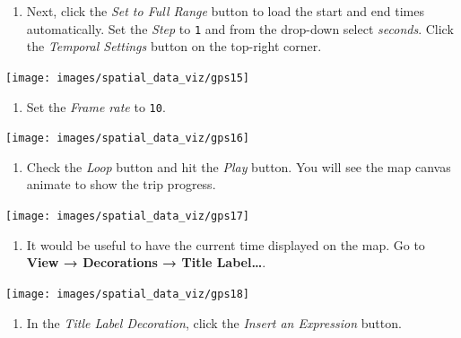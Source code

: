 \documentclass[
  12pt,
  a4paper]{article}
\providecommand{\tightlist}{%
  \setlength{\itemsep}{0pt}\setlength{\parskip}{0pt}}
\begin{document}
\begin{enumerate}
\def\labelenumi{\arabic{enumi}.}
\setcounter{enumi}{14}
\tightlist
\item
  Next, click the \emph{Set to Full Range} button to load the start and
  end times automatically. Set the \emph{Step} to \texttt{1} and from
  the drop-down select \emph{seconds}. Click the \emph{Temporal
  Settings} button on the top-right corner.
\end{enumerate}

\begin{center}\texttt{[image: images/spatial\_data\_viz/gps15]} \end{center}

\begin{enumerate}
\def\labelenumi{\arabic{enumi}.}
\setcounter{enumi}{15}
\tightlist
\item
  Set the \emph{Frame rate} to \texttt{10}.
\end{enumerate}

\begin{center}\texttt{[image: images/spatial\_data\_viz/gps16]} \end{center}

\begin{enumerate}
\def\labelenumi{\arabic{enumi}.}
\setcounter{enumi}{16}
\tightlist
\item
  Check the \emph{Loop} button and hit the \emph{Play} button. You will
  see the map canvas animate to show the trip progress.
\end{enumerate}

\begin{center}\texttt{[image: images/spatial\_data\_viz/gps17]} \end{center}

\begin{enumerate}
\def\labelenumi{\arabic{enumi}.}
\setcounter{enumi}{17}
\tightlist
\item
  It would be useful to have the current time displayed on the map. Go
  to \textbf{View → Decorations → Title Label\ldots{}}.
\end{enumerate}

\begin{center}\texttt{[image: images/spatial\_data\_viz/gps18]} \end{center}

\begin{enumerate}
\def\labelenumi{\arabic{enumi}.}
\setcounter{enumi}{18}
\tightlist
\item
  In the \emph{Title Label Decoration}, click the \emph{Insert an
  Expression} button.
\end{enumerate}
\end{document}
